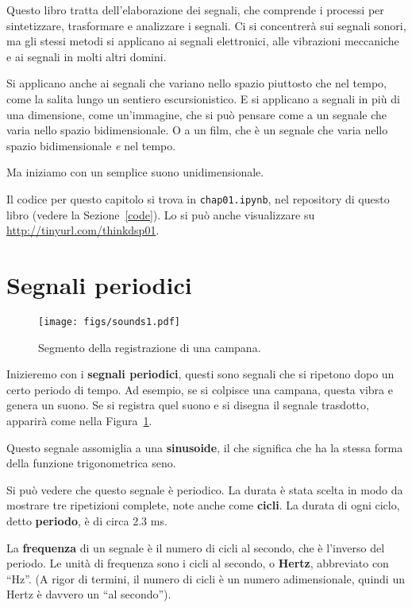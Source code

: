 \documentclass[12pt]{book} \usepackage[width=5.5in,height=8.5in, hmarginratio=3:2,vmarginratio=1:1]{geometry}
\begin{document}
Questo libro tratta dell'elaborazione dei segnali, che comprende i processi per sintetizzare, trasformare e analizzare i segnali. Ci si concentrerà sui segnali sonori, ma gli stessi metodi si applicano ai segnali elettronici, alle vibrazioni meccaniche e ai segnali in molti altri domini.

Si applicano anche ai segnali che variano nello spazio piuttosto che nel tempo, come la salita lungo un sentiero escursionistico. E si applicano a segnali in più di una dimensione, come un'immagine, che si può pensare come a un segnale che varia nello spazio bidimensionale. O a un film, che è un segnale che varia nello spazio bidimensionale {\it e} nel tempo.

Ma iniziamo con un semplice suono unidimensionale.

Il codice per questo capitolo si trova in {\tt chap01.ipynb}, nel repository di questo libro (vedere la Sezione~\ref{code}). Lo si può anche visualizzare su \url{http://tinyurl.com/thinkdsp01}.

\section{Segnali periodici} \label{violin} 

\begin{figure} 

\centerline{\texttt{[image: figs/sounds1.pdf]}} \caption{Segmento della registrazione di una campana.} \label{fig.sounds1} \end{figure} 

Inizieremo con i {\bf segnali periodici}, questi sono segnali che si ripetono dopo un certo periodo di tempo. Ad esempio, se si colpisce una campana, questa vibra e genera un suono. Se si registra quel suono e si disegna il segnale trasdotto, apparirà come nella Figura~\ref{fig.sounds1}.

Questo segnale assomiglia a una {\bf sinusoide}, il che significa che ha la stessa forma della funzione trigonometrica seno.

Si può vedere che questo segnale è periodico. La durata è stata scelta in modo da mostrare tre ripetizioni complete, note anche come {\bf cicli}. La durata di ogni ciclo, detto {\bf periodo}, è di circa 2.3 ms.

La {\bf frequenza} di un segnale è il numero di cicli al secondo, che è l'inverso del periodo. Le unità di frequenza sono i cicli al secondo, o {\bf Hertz}, abbreviato con ``Hz''. (A rigor di termini, il numero di cicli è un numero adimensionale, quindi un Hertz è davvero un ``al secondo'').
\end{document}
